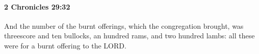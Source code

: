 
		\paragraph{2 Chronicles 29:32} %
			\label{2CHRONICLES-29-32}

			And the number of the burnt offerings, which the congregation brought, was threescore and ten bullocks, an hundred rams, and two hundred lambs: all these were for a burnt offering to the LORD.



